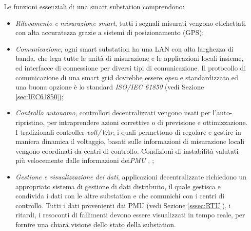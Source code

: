 Le funzioni essenziali di una smart substation comprendono:
\begin{itemize}
	\item \emph{Rilevamento e misurazione smart}, tutti i segnali misurati vengono etichettati con alta accuratezza grazie a sistemi di posizionamento (GPS);
	\item \emph{Comunicazione}, ogni smart substation ha una LAN con alta larghezza di banda, che lega tutte le unità di misurazione e le applicazioni locali insieme, ed interfacce di connessione per diversi tipi di comunicazione. Il protocollo di comunicazione di una smart grid dovrebbe essere \emph{open} e standardizzato ed una buona opzione è lo standard \emph{ISO/IEC 61850} (vedi Sezione \ref{sec:IEC61850});
	\item \emph{Controllo autonomo}, controllori decentralizzati vengono usati per l'auto-ripristino, per intraprendere azioni correttive o di previsione e ottimizzazione. I tradizionali controller \emph{volt/VAr}, i quali permettono di regolare e gestire in maniera dinamica il voltaggio, basati sulle informazioni di misurazione locali vengono coordinati da centri di controllo. Condizioni di instabilità valutati più velocemente dalle informazioni dei\emph{PMU} \cite{voltsta}, \cite{stavolt};
	\item \emph{Gestione e visualizzazione dei dati}, applicazioni decentralizzate richiedono un appropriato sistema di gestione di dati distribuito, il quale gestisca e condivida i dati con le altre substation e che comunichi con i centri di controllo. Tutti i dati provenienti dai PMU (vedi Sezione \ref{sssec:RTU}), i ritardi, i resoconti di fallimenti devono essere visualizzati in tempo reale, per fornire una chiara visione dello stato della substation. 
\end{itemize}
 
